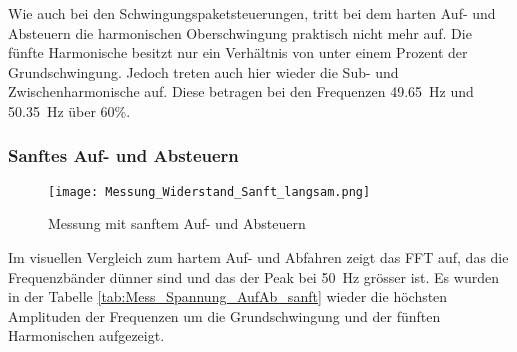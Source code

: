 Wie auch bei den Schwingungspaketsteuerungen, tritt bei dem harten Auf- und Absteuern die harmonischen Oberschwingung praktisch nicht mehr auf. Die fünfte Harmonische besitzt nur ein Verhältnis von unter einem Prozent der Grundschwingung. Jedoch treten auch hier wieder die Sub- und Zwischenharmonische auf. Diese betragen bei den Frequenzen \SI{49.65}{Hz} und \SI{50.35}{Hz} über 60\%. 

\newpage
\subsubsection*{Sanftes Auf- und Absteuern}
\begin{figure}[ht!]
	\centering
	\texttt{[image: Messung\_Widerstand\_Sanft\_langsam.png]}	
	\caption{Messung mit sanftem Auf- und Absteuern}\label{fig:Mess_Sanft_langsam}
\end{figure}

Im visuellen Vergleich zum hartem Auf- und Abfahren zeigt das FFT auf, das die Frequenzbänder dünner sind und das der Peak bei \SI{50}{Hz} grösser ist. Es wurden in der Tabelle \ref{tab:Mess_Spannung_AufAb_sanft} wieder die höchsten Amplituden der Frequenzen um die Grundschwingung und der fünften Harmonischen aufgezeigt. 

